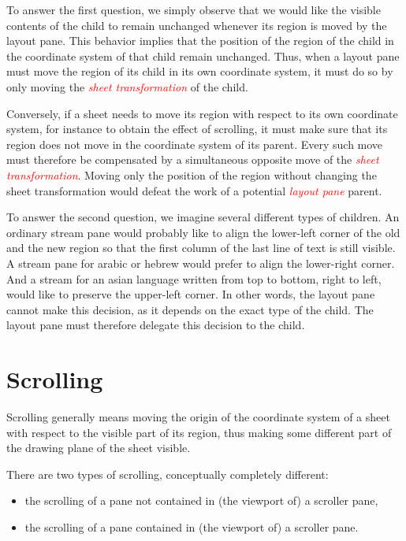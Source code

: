 \documentclass{article}
\newenvironment{itemize0}{
\begin{itemize}
\setlength{\parskip}{0cm}%
}
{\end{itemize}}
\newcommand{\gloss}[1]{\textsl{\textcolor{red}{#1}}}
\begin{document}
To answer the first question, we simply observe that we would like the
visible contents of the child to remain unchanged whenever its region
is moved by the layout pane.  This behavior implies that the position
of the region of the child in the coordinate system of that child
remain unchanged.  Thus, when a layout pane must move the region of
its child in its own coordinate system, it must do so by only moving
the \gloss{sheet transformation} of the child.

Conversely, if a sheet needs to move its region with respect to its
own coordinate system, for instance to obtain the effect of scrolling,
it must make sure that its region does not move in the coordinate
system of its parent.  Every such move must therefore be compensated
by a simultaneous opposite move of the \gloss{sheet transformation}.
Moving only the position of the region without changing the sheet
transformation would defeat the work of a potential \gloss{layout
pane} parent. 

To answer the second question, we imagine several different types of
children.  An ordinary stream pane would probably like to align the
lower-left corner of the old and the new region so that the first
column of the last line of text is still visible.  A stream pane for
arabic or hebrew would prefer to align the lower-right corner.  And a
stream for an asian language written from top to bottom, right to
left, would like to preserve the upper-left corner.  In other words,
the layout pane cannot make this decision, as it depends on the exact
type of the child.  The layout pane must therefore delegate this
decision to the child.  

\section{Scrolling}

Scrolling generally means moving the origin of the coordinate system
of a sheet with respect to the visible part of its region, thus making
some different part of the drawing plane of the sheet visible. 

There are two types of scrolling, conceptually completely different:

\begin{itemize0}
\item the scrolling of a pane not contained in (the viewport of) a
scroller pane, 
\item the scrolling of a pane contained in (the viewport of) a
scroller pane. 
\end{itemize0}
\end{document}
